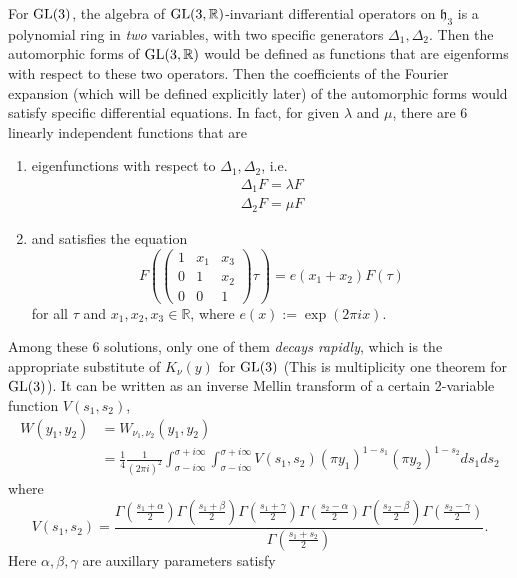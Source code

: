 For $\operatorname{\mathrm{GL}}(3)$, the algebra of $\operatorname{\mathrm{GL}}(3, \mathbb{R})$-invariant differential operators on $\mathfrak{h}_{3}$ is a polynomial ring in \emph{two} variables, with two specific generators $\Delta_{1}, \Delta_{2}$.
Then the automorphic forms of $\operatorname{\mathrm{GL}}(3, \mathbb{R})$ would be defined as functions that are eigenforms with respect to these two operators.
Then the coefficients of the Fourier expansion (which will be defined explicitly later) of the automorphic forms would satisfy specific differential equations.
In fact, for given $\lambda$ and $\mu$, there are 6 linearly independent functions that are
\begin{enumerate}
    \item eigenfunctions with respect to $\Delta_{1}, \Delta_{2}$, i.e. 
    \begin{align*}
        \Delta_{1}F = \lambda F \\
        \Delta_{2}F = \mu F
    \end{align*}
    \item and satisfies the equation
    $$
        F\left(\begin{pmatrix}
        1 & x_{1} & x_{3} \\ 0 & 1 & x_{2} \\ 0 & 0 & 1
        \end{pmatrix}\tau\right) = e(x_{1} + x_{2})F(\tau)
    $$
    for all $\tau$ and $x_{1}, x_{2}, x_{3} \in \mathbb{R}$, where $e(x):= \exp(2\pi i x)$.
\end{enumerate}
Among these 6 solutions, only one of them \emph{decays rapidly}, which is the appropriate substitute of $K_{\nu}(y)$ for $\operatorname{\mathrm{GL}}(3)$ (This is multiplicity one theorem for $\operatorname{\mathrm{GL}}(3)$).
It can be written as an inverse Mellin transform of a certain 2-variable function $V(s_{1}, s_{2})$,
\begin{align*}
W(y_1, y_2) &= W_{\nu_{1}, \nu_{2}}(y_{1}, y_{2}) \\
&= \frac{1}{4} \frac{1}{(2\pi i)^{2}} \int_{\sigma - i\infty}^{\sigma + i\infty} \int_{\sigma - i\infty}^{\sigma + i\infty} V(s_1, s_2)(\pi y_{1})^{1-s_{1}} (\pi y_{2})^{1-s_{2}} ds_{1}ds_{2}
\end{align*}
where
$$
V(s_{1}, s_{2}) = \frac{\Gamma\left(\frac{s_{1} + \alpha}{2}\right)\Gamma\left(\frac{s_{1} + \beta}{2}\right)\Gamma\left(\frac{s_{1} + \gamma}{2}\right)\Gamma\left(\frac{s_{2} - \alpha}{2}\right)\Gamma\left(\frac{s_{2} - \beta}{2}\right)\Gamma\left(\frac{s_{2} - \gamma}{2}\right)}{\Gamma\left(\frac{s_{1} + s_{2}}{2}\right)}.
$$
Here $\alpha, \beta, \gamma$ are auxillary parameters satisfy
